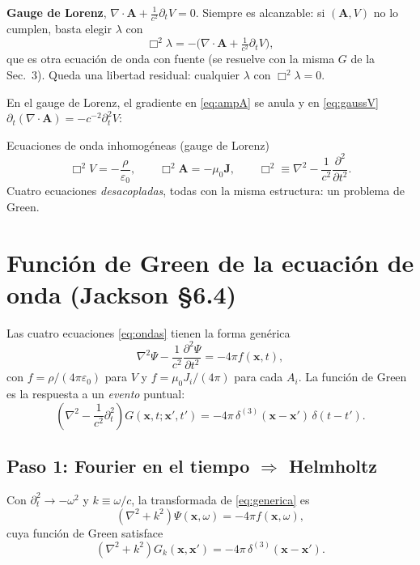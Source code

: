 \documentclass[11pt,a4paper]{article}
\newcommand{\boxop}{\Box^2}
\theoremstyle{remark}
\begin{document}
\textbf{Gauge de Lorenz}, $\nabla\cdot\mathbf A+\frac1{c^2}\partial_tV=0$. Siempre es alcanzable: si
$(\mathbf A,V)$ no lo cumplen, basta elegir $\lambda$ con
\[
\boxop\lambda=-\Big(\nabla\cdot\mathbf A+\tfrac1{c^2}\partial_tV\Big),
\]
que es otra ecuación de onda con fuente (se resuelve con la misma $G$ de la Sec.~3). Queda una
libertad residual: cualquier $\lambda$ con $\boxop\lambda=0$.

En el gauge de Lorenz, el gradiente en \eqref{eq:ampA} se anula y en \eqref{eq:gaussV}
$\partial_t(\nabla\cdot\mathbf A)=-c^{-2}\partial_t^2V$:
\begin{resbox}{Ecuaciones de onda inhomogéneas (gauge de Lorenz)}
\begin{equation}
\boxop V=-\frac{\rho}{\varepsilon_0},\qquad \boxop\mathbf A=-\mu_0\mathbf J,\qquad
\boxop\equiv\nabla^2-\frac1{c^2}\frac{\partial^2}{\partial t^2}.
\label{eq:ondas}
\end{equation}
Cuatro ecuaciones \emph{desacopladas}, todas con la misma estructura: un problema de Green.
\end{resbox}

\section{Función de Green de la ecuación de onda (Jackson §6.4)}

Las cuatro ecuaciones \eqref{eq:ondas} tienen la forma genérica
\begin{equation}
\nabla^2\Psi-\frac1{c^2}\frac{\partial^2\Psi}{\partial t^2}=-4\pi f(\mathbf x,t),
\label{eq:generica}
\end{equation}
con $f=\rho/(4\pi\varepsilon_0)$ para $V$ y $f=\mu_0J_i/(4\pi)$ para cada $A_i$. La función de Green
es la respuesta a un \emph{evento} puntual:
\begin{equation}
\left(\nabla^2-\frac1{c^2}\partial_t^2\right)G(\mathbf x,t;\mathbf x',t')=-4\pi\,\delta^{(3)}(\mathbf x-\mathbf x')\,\delta(t-t').
\label{eq:defG}
\end{equation}

\subsection{Paso 1: Fourier en el tiempo $\Rightarrow$ Helmholtz}

Con $\partial_t^2\to-\omega^2$ y $k\equiv\omega/c$, la transformada de \eqref{eq:generica} es
\begin{equation}
(\nabla^2+k^2)\Psi(\mathbf x,\omega)=-4\pi f(\mathbf x,\omega),
\end{equation}
cuya función de Green satisface
\begin{equation}
(\nabla^2+k^2)G_k(\mathbf x,\mathbf x')=-4\pi\,\delta^{(3)}(\mathbf x-\mathbf x').
\label{eq:helm}
\end{equation}
\end{document}
